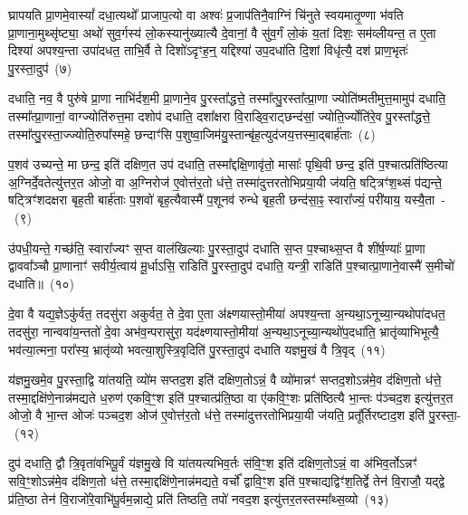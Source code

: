 घ्रापयति प्रा॒णमे॒वास्यां᳚ दधा॒त्यथो᳚ प्राजाप॒त्यो वा अश्वः॑ प्र॒जा\-प॑तिनै॒वाग्निं चि॑नुते स्वयमा\-तृ॒ण्णा भ॑वति प्रा॒णाना॒मुथ्सृ॑ष्ट्या॒ अथो॑ सुव॒र्गस्य॑ लो॒कस्यानु॑ख्यात्यै दे॒वानां॒ वै सु॑व॒र्गं लो॒कं य॒तां दिशः॒ सम॑व्लीयन्त॒ त ए॒ता दिश्या॑ अपश्य॒न्ता उपा॑दधत॒ ताभि॒र्वै ते दिशो॑\-ऽदृꣳह॒न्॒ यद्दिश्या॑ उप॒\-दधा॑ति दि॒शां विधृ॑त्यै॒ दश॑ प्राण॒भृतः॑ पु॒रस्ता॒दुप॑~(७)\ip

दधाति॒ नव॒ वै पुरु॑षे प्रा॒णा नाभि॑र्दश॒मी प्रा॒णाने॒व पु॒रस्ता᳚द्धत्ते॒ तस्मा᳚त्पु॒रस्ता᳚त्प्रा॒णा ज्योति॑ष्मतीमुत्त॒मामुप॑ दधाति॒ तस्मा᳚त्प्रा॒णानां॒ वाग्ज्योति॑रुत्त॒मा दशोप॑ दधाति॒ दशा᳚क्षरा वि॒राड्वि॒राट्छन्द॑सां॒ ज्योति॒र्ज्योति॑रे॒व पु॒रस्ता᳚द्धत्ते॒ तस्मा᳚त्पु॒रस्ता॒ज्ज्योति॒रुपा᳚स्महे॒ छन्दाꣳ॑सि प॒शुष्वा॒जिम॑यु॒स्तान्बृ॑ह॒त्युद॑जय॒त्तस्मा॒द्बार्\mbox{}ह॑ताः~(८)\ip

प॒शव॑ उच्यन्ते॒ मा छन्द॒ इति॑ दक्षिण॒त उप॑ दधाति॒ तस्मा᳚द्\-दक्षि॒णावृ॑तो॒ मासाः᳚ पृथि॒वी छन्द॒ इति॑ प॒श्चात्प्रति॑ष्ठित्या अ॒ग्निर्दे॒वतेत्यु॑त्तर॒त ओजो॒ वा अ॒ग्निरोज॑ ए॒वोत्त॑र॒तो ध॑त्ते॒ तस्मा॑दुत्तरतोभिप्रया॒यी ज॑यति॒ षट्त्रिꣳ॑श॒थ्सं प॑द्यन्ते॒ षट्त्रिꣳ॑शदक्षरा बृह॒ती बार्\mbox{}ह॑ताः प॒शवो॑ बृह॒त्यैवास्मै॑ प॒शूनव॑ रुन्धे बृह॒ती छन्द॑सा॒ꣴ॒ स्वारा᳚ज्यं॒ परी॑याय॒ यस्यै॒ता~-~(९)\ip

उ॑पधी॒यन्ते॒ गच्छ॑ति॒ स्वारा᳚ज्यꣳ स॒प्त वाल॑खिल्याः पु॒रस्ता॒दुप॑ दधाति स॒प्त प॒श्चाथ्स॒प्त वै शी॑र्\mbox{}ष॒ण्याः᳚ प्रा॒णा द्वाववा᳚ञ्चौ प्रा॒णानाꣳ॑ सवीर्य॒त्वाय॑ मू॒र्धा\-ऽ\-सि॒ राडिति॑ पु॒रस्ता॒दुप॑ दधाति॒ यन्त्री॒ राडिति॑ प॒श्चात्प्रा॒णाने॒वास्मै॑ स॒मीचो॑ दधाति॥~(१०)\ip

{}

दे॒वा वै यद्य॒ज्ञे\-ऽकु॑र्वत॒ तदसु॑रा अकुर्वत॒ ते दे॒वा ए॒ता अ॑क्ष्णयास्तो॒मीया॑ अपश्य॒न्ता अ॒न्यथा॒\-ऽ\-नूच्या॒न्यथोपा॑दधत॒ तदसु॑रा॒ नान्ववा॑य॒न्ततो॑ दे॒वा अभ॑व॒न्परासु॑रा॒ यद॑क्ष्णयास्तो॒मीया॑ अ॒न्यथा॒\-ऽ\-नूच्या॒न्यथो॑प॒\-दधा॑ति॒ भ्रातृ॑व्याभिभूत्यै॒ भव॑त्या॒त्मना॒ परा᳚स्य॒ भ्रातृ॑व्यो भवत्या॒शुस्त्रि॒वृदिति॑ पु॒रस्ता॒दुप॑ दधाति यज्ञमु॒खं वै त्रि॒वृद्~(११)\ip

य॑ज्ञमु॒खमे॒व पु॒रस्ता॒द्वि या॑तयति॒ व्यो॑म सप्तद॒श इति॑ दक्षिण॒तो\-ऽन्नं॒ वै व्यो॑मान्नꣳ॑ सप्तद॒शो\-ऽन्न॑मे॒व द॑क्षिण॒तो ध॑त्ते॒ तस्मा॒द्दक्षि॑णे॒नान्न॑मद्यते ध॒रुण॑ एकवि॒ꣳ॒श इति॑ प॒श्चात्प्र॑ति॒ष्ठा वा ए॑कवि॒ꣳ॒शः प्रति॑ष्ठित्यै भा॒न्तः प॑ञ्चद॒श इत्यु॑त्तर॒त ओजो॒ वै भा॒न्त ओजः॑ पञ्चद॒श ओज॑ ए॒वोत्त॑र॒तो ध॑त्ते॒ तस्मा॑दुत्तरतोभिप्रया॒यी ज॑यति॒ प्रतू᳚र्तिरष्टाद॒श इति॑ पु॒रस्ता॒-~(१२)\ip

दुप॑ दधाति॒ द्वौ त्रि॒वृता॑वभिपू॒र्वं य॑ज्ञमु॒खे वि या॑तयत्यभिव॒र्तः स॑वि॒ꣳ॒श इति॑ दक्षिण॒तो\-ऽन्नं॒ वा अ॑भिव॒र्तो\-ऽन्नꣳ॑ सवि॒ꣳ॒शो\-ऽन्न॑मे॒व द॑क्षिण॒तो ध॑त्ते॒ तस्मा॒द्दक्षि॑णे॒नान्न॑मद्यते॒ वर्चो᳚ द्वावि॒ꣳ॒श इति॑ प॒श्चाद्यद्विꣳ॑श॒तिर्द्वे तेन॑ वि॒राजौ॒ यद्द्वे प्र॑ति॒ष्ठा तेन॑ वि॒राजो॑रे॒वाभि॑पू॒र्वम॒न्नाद्ये॒ प्रति॑ तिष्ठति॒ तपो॑ नवद॒श इत्यु॑त्तर॒तस्तस्मा᳚थ्स॒व्यो~(१३)\ip

